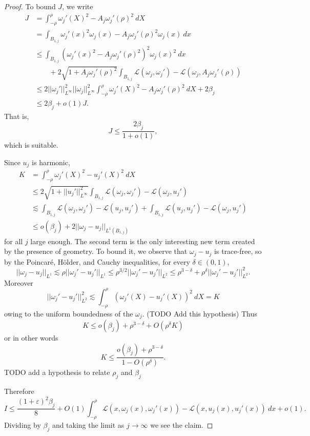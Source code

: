 \documentclass[reqno,12pt,letterpaper]{amsart}
\theoremstyle{definition}
\numberwithin{equation}{section}
\begin{document}
\begin{proof}
To bound $J$, we write
\begin{align*}
J &= \int_{-\rho}^\rho \omega_j'(X)^2 - A_j \omega_j'(\rho)^2 ~dX \\
&= \int_{B_{1, j}} \omega_j'(x)^2 \omega_j(x) - A_j \omega_j'(\rho)^2 \omega_j(x) ~dx \\
&\leq \int_{B_{1, j}} (\omega_j'(x)^2 - A_j \omega_j'(\rho)^2)^2 \omega_j(x)^2 ~dx \\
&\qquad + 2\sqrt{1 + A_j \omega_j'(\rho)^2} \int_{B_{1,j}} \mathscr L(\omega_j, \omega_j') - \mathscr L(\omega_j, A_j \omega_j'(\rho)) \\
&\leq 2 ||\omega_j' ||_{L^\infty}^2 ||\omega_j||_{L^\infty}^2 \int_{-\rho}^\rho \omega_j'(X)^2 - A_j \omega_j'(\rho)^2 ~dX + 2 \beta_j\\
&\leq 2\beta_j + o(1) J.
\end{align*}
That is,
$$J \leq \frac{2\beta_j}{1 + o(1)},$$
which is suitable.

Since $u_j$ is harmonic,
\begin{align*}
K &= \int_{-\rho}^\rho \omega_j'(X)^2 - u_j'(X)^2 ~dX \\
&\leq 2 \sqrt{1 + ||u_j'||_{L^\infty}^2} \int_{B_{1,j}} \mathscr L(\omega_j, \omega_j') - \mathscr L(\omega_j, u_j')\\
&\lesssim \int_{B_{1, j}} \mathscr L(\omega_j, \omega_j') - \mathscr L(u_j, u_j') + \int_{B_{1, j}} \mathscr L(u_j, u_j') - \mathscr L(\omega_j, u_j') \\
&\leq o(\beta_j) + 2||\omega_j - u_j||_{L^1(B_{1,j})}
\end{align*}
for all $j$ large enough.
The second term is the only interesting new term created by the presence of geometry.
To bound it, we observe that $\omega_j - u_j$ is trace-free, so by the Poincar\'e, H\"older, and Cauchy inequalities, for every $\delta \in (0, 1)$,
$$||\omega_j - u_j||_{L^1} \lesssim \rho ||\omega_j' - u_j'||_{L^1} \leq \rho^{3/2} ||\omega_j' - u_j'||_{L^2} \leq \rho^{3 - \delta} + \rho^\delta ||\omega_j' - u_j'||_{L^2}^2.$$
Moreover
$$||\omega_j' - u_j'||_{L^2}^2 \lesssim \int_{-\rho}^\rho (\omega_j'(X) - u_j'(X))^2 ~dX = K$$
owing to the uniform boundedness of the $\omega_j$. (TODO Add this hypothesis)
Thus
$$K \leq o(\beta_j) + \rho^{3 - \delta} + O(\rho^\delta K)$$
or in other words
$$K \leq \frac{o(\beta_j) + \rho^{3 - \delta}}{1 - O(\rho^\delta)}.$$
TODO add a hypothesis to relate $\rho_j$ and $\beta_j$

Therefore
$$I \leq \frac{(1 + \varepsilon)^2\beta_j}{8} + O(1)\int_{-\rho}^\rho \mathscr L(x, \omega_j(x), \omega_j'(x)) - \mathscr L(x, u_j(x), u_j'(x)) ~dx + o(1).$$
Dividing by $\beta_j$ and taking the limit as $j \to \infty$ we see the claim.
\end{proof}
\end{document}
